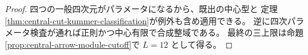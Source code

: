 \begin{proof}
四つの一般四次元がパラメータになるから、既出の中心型と
定理\ref{thm:central-cut-kummer-classification}が例外も含め適用できる。
逆に四次パラメータ検査が通れば正則かつ中心有限で合成整域である。
最終の三上限は命題\ref{prop:central-arrow-module-cutoff}で $L=12$ として得る。
\end{proof}
